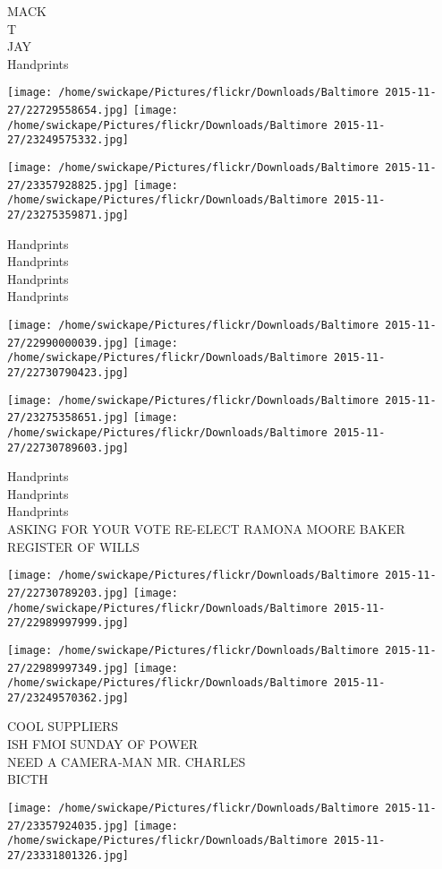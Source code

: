 \documentclass[10pt,letterpaper]{article}
\begin{document}
MACK\\
T\\
JAY\\
Handprints
\pagebreak

\texttt{[image: /home/swickape/Pictures/flickr/Downloads/Baltimore 2015-11-27/22729558654.jpg]}
\texttt{[image: /home/swickape/Pictures/flickr/Downloads/Baltimore 2015-11-27/23249575332.jpg]}

\texttt{[image: /home/swickape/Pictures/flickr/Downloads/Baltimore 2015-11-27/23357928825.jpg]}
\texttt{[image: /home/swickape/Pictures/flickr/Downloads/Baltimore 2015-11-27/23275359871.jpg]}

Handprints\\
Handprints\\
Handprints\\
Handprints
\pagebreak

\texttt{[image: /home/swickape/Pictures/flickr/Downloads/Baltimore 2015-11-27/22990000039.jpg]}
\texttt{[image: /home/swickape/Pictures/flickr/Downloads/Baltimore 2015-11-27/22730790423.jpg]}

\texttt{[image: /home/swickape/Pictures/flickr/Downloads/Baltimore 2015-11-27/23275358651.jpg]}
\texttt{[image: /home/swickape/Pictures/flickr/Downloads/Baltimore 2015-11-27/22730789603.jpg]}

Handprints\\
Handprints\\
Handprints\\
ASKING FOR YOUR VOTE RE{-}ELECT RAMONA MOORE BAKER REGISTER OF WILLS
\pagebreak

\texttt{[image: /home/swickape/Pictures/flickr/Downloads/Baltimore 2015-11-27/22730789203.jpg]}
\texttt{[image: /home/swickape/Pictures/flickr/Downloads/Baltimore 2015-11-27/22989997999.jpg]}

\texttt{[image: /home/swickape/Pictures/flickr/Downloads/Baltimore 2015-11-27/22989997349.jpg]}
\texttt{[image: /home/swickape/Pictures/flickr/Downloads/Baltimore 2015-11-27/23249570362.jpg]}

COOL SUPPLIERS\\
ISH FMOI SUNDAY OF POWER\\
NEED A CAMERA{-}MAN MR. CHARLES\\
BICTH
\pagebreak

\texttt{[image: /home/swickape/Pictures/flickr/Downloads/Baltimore 2015-11-27/23357924035.jpg]}
\texttt{[image: /home/swickape/Pictures/flickr/Downloads/Baltimore 2015-11-27/23331801326.jpg]}
\end{document}
